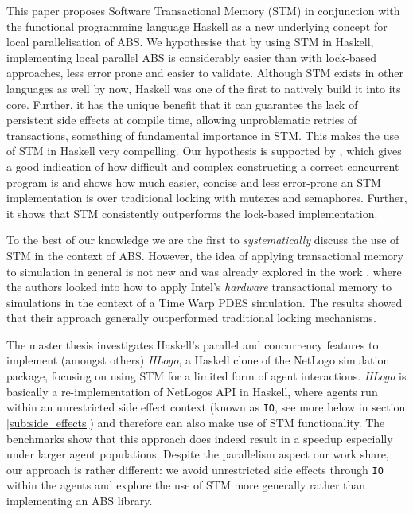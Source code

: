 This paper proposes Software Transactional Memory (STM) in conjunction with the functional programming language Haskell \cite{hudak_history_2007} as a new underlying concept for local parallelisation of ABS. We hypothesise that by using STM in Haskell, implementing local parallel ABS is considerably easier than with lock-based approaches, less error prone and easier to validate. Although STM exists in other languages as well by now, Haskell was one of the first to natively build it into its core. Further, it has the unique benefit that it can guarantee the lack of persistent side effects at compile time, allowing unproblematic retries of transactions, something of fundamental importance in STM. This makes the use of STM in Haskell very compelling. 
Our hypothesis is supported by \cite{discolo_lock_2006}, which gives a good indication of how difficult and complex constructing a correct concurrent program is and shows how much easier, concise and less error-prone an STM implementation is over traditional locking with mutexes and semaphores. Further, it shows that STM consistently outperforms the lock-based implementation.


\medskip

To the best of our knowledge we are the first to \textit{systematically} discuss the use of STM in the context of ABS. However, the idea of applying transactional memory to simulation in general is not new and was already explored in the work \cite{hay_experiments_2015}, where the authors looked into how to apply Intel's \textit{hardware} transactional memory to simulations in the context of a Time Warp PDES simulation. The results showed that their approach generally outperformed traditional locking mechanisms.

The master thesis \cite{bezirgiannis_improving_2013} investigates Haskell's parallel and concurrency features to implement (amongst others) \textit{HLogo}, a Haskell clone of the NetLogo \cite{wilensky_introduction_2015} simulation package, focusing on using STM for a limited form of agent interactions. \textit{HLogo} is basically a re-implementation of NetLogos API in Haskell, where agents run within an unrestricted side effect context (known as \texttt{IO}, see more below in section \ref{sub:side_effects}) and therefore can also make use of STM functionality. The benchmarks show that this approach does indeed result in a speedup especially under larger agent populations. Despite the parallelism aspect our work share, our approach is rather different: we avoid unrestricted side effects through \texttt{IO} within the agents and explore the use of STM more generally rather than implementing an ABS library.

